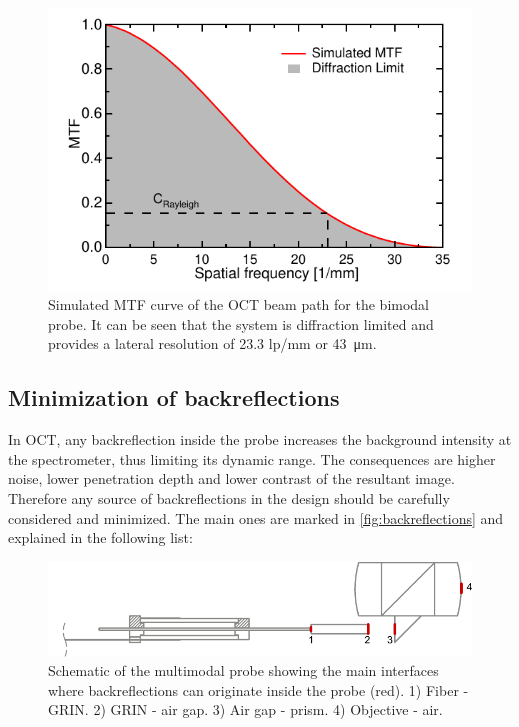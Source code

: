 \begin{figure}[h!]\centering
      \includegraphics{figures/30_DesignSimulation/Optical/MTF/MTF_Sim.pdf}
      \caption{Simulated MTF curve of the OCT beam path for the bimodal probe. It can be seen that the system is diffraction limited and provides a lateral resolution of 23.3 lp/mm or \SI{43}{\micro\meter}.}
      \label{fig:MTFsim}
\end{figure}

\subsection{Minimization of backreflections}
In OCT, any backreflection inside the probe increases the background intensity at the spectrometer, thus limiting its dynamic range. The consequences are higher noise, lower penetration depth and lower contrast of the resultant image. Therefore any source of backreflections in the design should be carefully considered and minimized. The main ones are marked in \autoref{fig:backreflections} and explained in the following list:

\begin{figure}[h!]\centering
      \includegraphics{figures/30_DesignSimulation/Optical/Backreflections/backreflections.pdf}
      \caption{Schematic of the multimodal probe showing the main interfaces where backreflections can originate inside the probe (red). 1) Fiber - GRIN. 2) GRIN - air gap. 3) Air gap - prism. 4) Objective - air. }
      \label{fig:backreflections}
\end{figure}

